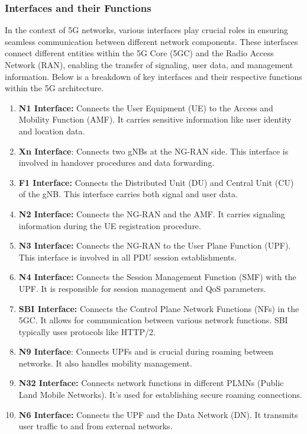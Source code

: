 \documentclass{report}
\begin{document}
\subsubsection{Interfaces and their Functions}
In the context of 5G networks, various interfaces play crucial roles in ensuring seamless communication between different network components. These interfaces connect different entities within the 5G Core (5GC) and the Radio Access Network (RAN), enabling the transfer of signaling, user data, and management information. Below is a breakdown of key interfaces and their respective functions within the 5G architecture.
\begin{enumerate}
    \item \textbf{N1 Interface:} Connects the User Equipment (UE) to the Access and Mobility Function (AMF). It carries sensitive information like user identity and location data. 
    \item \textbf{Xn Interface}: Connects two gNBs at the NG-RAN side. This interface is involved in handover procedures and data forwarding.
    \item \textbf{F1 Interface:} Connects the Distributed Unit (DU) and Central Unit (CU) of the gNB. This interface carries both signal and user data.\cite{mahyoub2024security}
    \item \textbf{N2 Interface:} Connects the NG-RAN and the AMF.  It carries signaling information during the UE registration procedure.
    \item \textbf{N3 Interface:} Connects the NG-RAN to the User Plane Function (UPF). This interface is involved in all PDU session establishments.\cite{mahyoub2024security}
    \item \textbf{N4 Interface:} Connects the Session Management Function (SMF) with the UPF. It is responsible for session management and QoS parameters.
    \item \textbf{SBI Interface:} Connects the Control Plane Network Functions (NFs) in the 5GC. It allows for communication between various network functions. SBI typically uses protocols like HTTP/2.
    \item \textbf{N9 Interface}: Connects UPFs and is crucial during roaming between networks. It also handles mobility management.
    \item \textbf{N32 Interface:} Connects network functions in different PLMNs (Public Land Mobile Networks). It's used for establishing secure roaming connections.\cite{mahyoub2024security}
    \item \textbf{N6 Interface:} Connects the UPF and the Data Network (DN). It transmits user traffic to and from external networks.
\end{enumerate}
\end{document}
